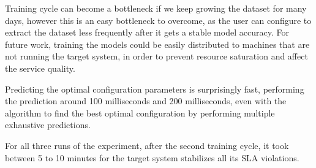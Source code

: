 Training cycle can become a bottleneck if we keep growing the dataset for many days, however this is an easy bottleneck to overcome, as the user can configure \projectname{} to extract the dataset less frequently after it gets a stable model accuracy. For future work, training the models could be easily distributed to machines that are not running the target system, in order to prevent resource saturation and affect the service quality.

Predicting the optimal configuration parameters is surprisingly fast, performing the prediction around 100 milliseconds and 200 milliseconds, even with the algorithm to find the best optimal configuration by performing multiple exhaustive predictions.

For all three runs of the experiment, after the second training cycle, it took between 5 to 10 minutes for the target system stabilizes all its SLA violations.


